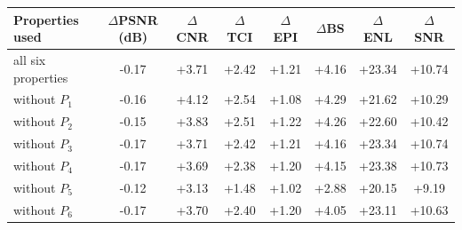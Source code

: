 \begin{tabular}{lccccccc}
\toprule
Properties used & $\Delta$PSNR (dB) & $\Delta$CNR & $\Delta$TCI & $\Delta$EPI & $\Delta$BS & $\Delta$ENL & $\Delta$SNR \\
\midrule
all six properties & -0.17 & +3.71 & +2.42 & +1.21 & +4.16 & +23.34 & +10.74 \\
\midrule
without $P_1$ & -0.16 & +4.12 & +2.54 & +1.08 & +4.29 & +21.62 & +10.29 \\
without $P_2$ & -0.15 & +3.83 & +2.51 & +1.22 & +4.26 & +22.60 & +10.42 \\
without $P_3$ & -0.17 & +3.71 & +2.42 & +1.21 & +4.16 & +23.34 & +10.74 \\
without $P_4$ & -0.17 & +3.69 & +2.38 & +1.20 & +4.15 & +23.38 & +10.73 \\
without $P_5$ & -0.12 & +3.13 & +1.48 & +1.02 & +2.88 & +20.15 & +9.19 \\
without $P_6$ & -0.17 & +3.70 & +2.40 & +1.20 & +4.05 & +23.11 & +10.63 \\
\bottomrule
\end{tabular}
